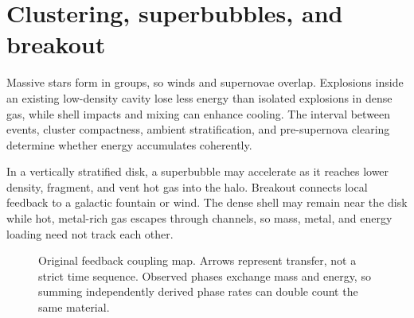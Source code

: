 \section{Clustering, superbubbles, and breakout}

Massive stars form in groups, so winds and supernovae overlap.  Explosions inside an
existing low-density cavity lose less energy than isolated explosions in dense gas,
while shell impacts and mixing can enhance cooling.  The interval between events,
cluster compactness, ambient stratification, and pre-supernova clearing determine
whether energy accumulates coherently.

In a vertically stratified disk, a superbubble may accelerate as it reaches lower
density, fragment, and vent hot gas into the halo.  Breakout connects local feedback
to a galactic fountain or wind.  The dense shell may remain near the disk while hot,
metal-rich gas escapes through channels, so mass, metal, and energy loading need not
track each other.

\begin{figure}[tbp]
\centering
{}
\caption{Original feedback coupling map.  Arrows represent transfer, not a strict
time sequence.  Observed phases exchange mass and energy, so summing independently
derived phase rates can double count the same material.}
\label{fig:feedback-coupling-map}
\end{figure}


